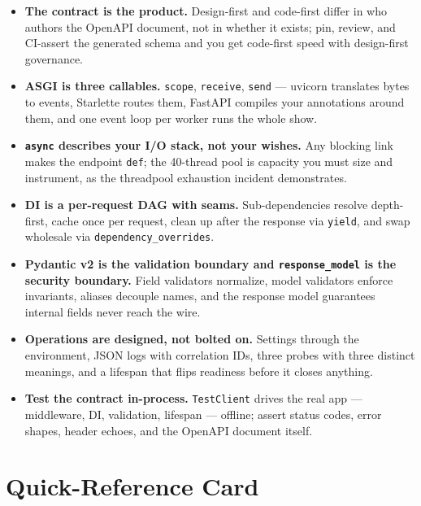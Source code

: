 \begin{itemize}[itemsep=0.4em]
  \item \textbf{The contract is the product.} Design-first and code-first
        differ in who authors the OpenAPI document, not in whether it exists;
        pin, review, and CI-assert the generated schema and you get code-first
        speed with design-first governance.
  \item \textbf{ASGI is three callables.} \texttt{scope}, \texttt{receive},
        \texttt{send} --- uvicorn translates bytes to events, Starlette routes
        them, FastAPI compiles your annotations around them, and one event
        loop per worker runs the whole show.
  \item \textbf{\texttt{async} describes your I/O stack, not your wishes.}
        Any blocking link makes the endpoint \texttt{def}; the 40-thread
        pool is capacity you must size and instrument, as the threadpool
        exhaustion incident demonstrates.
  \item \textbf{DI is a per-request DAG with seams.} Sub-dependencies resolve
        depth-first, cache once per request, clean up after the response via
        \texttt{yield}, and swap wholesale via
        \texttt{dependency\_overrides}.
  \item \textbf{Pydantic v2 is the validation boundary and
        \texttt{response\_model} is the security boundary.} Field validators
        normalize, model validators enforce invariants, aliases decouple
        names, and the response model guarantees internal fields never reach
        the wire.
  \item \textbf{Operations are designed, not bolted on.} Settings through the
        environment, JSON logs with correlation IDs, three probes with three
        distinct meanings, and a lifespan that flips readiness before it
        closes anything.
  \item \textbf{Test the contract in-process.} \texttt{TestClient} drives the
        real app --- middleware, DI, validation, lifespan --- offline; assert
        status codes, error shapes, header echoes, and the OpenAPI document
        itself.
\end{itemize}

\section{Quick-Reference Card}
\label{sec:ch6-quickref}

